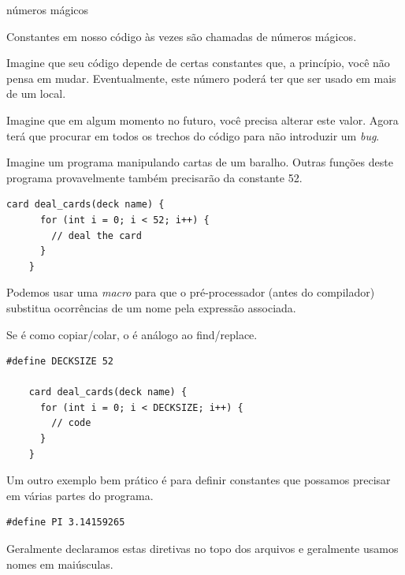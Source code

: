 \documentclass{beamer}
\begin{document}
\begin{frame}{números mágicos}

  Constantes em nosso código às vezes são chamadas de números mágicos.

  Imagine que seu código depende de certas constantes que, a
  princípio, você não pensa em mudar. Eventualmente, este número
  poderá ter que ser usado em mais de um local.

  Imagine que em algum momento no futuro, você precisa alterar este
  valor. Agora terá que procurar em todos os trechos do código para
  não introduzir um \emph{bug}.

  \framebreak

  Imagine um programa manipulando cartas de um baralho. Outras funções
  deste programa provavelmente também precisarão da constante 52.

  \begin{lstlisting}[style=normalc]
    card deal_cards(deck name) {
      for (int i = 0; i < 52; i++) {
        // deal the card
      }
    }
  \end{lstlisting}

  \framebreak

  Podemos usar uma \emph{macro} para que o pré-processador (antes do
  compilador) substitua ocorrências de um nome pela expressão
  associada.

  Se  é como copiar/colar, o  é
  análogo ao find/replace.\vspace{.5cm}

  \begin{lstlisting}[style=normalc]
    #define DECKSIZE 52

    card deal_cards(deck name) {
      for (int i = 0; i < DECKSIZE; i++) {
        // code
      }
    }
  \end{lstlisting}

  \framebreak

  Um outro exemplo bem prático é para definir constantes que possamos
  precisar em várias partes do programa.\vspace{.5cm}

  \begin{lstlisting}[style=normalc]
    #define PI 3.14159265    
  \end{lstlisting}

  Geralmente declaramos estas diretivas no topo dos arquivos
   e geralmente usamos nomes em maiúsculas.

\end{frame}
\end{document}
